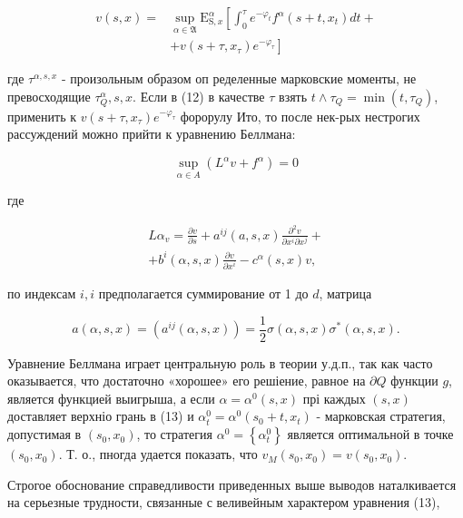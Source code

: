 \documentclass[10pt]{article}
\begin{document}
\[

\begin{aligned}

v(s, x)= & \sup _{\alpha \in \mathfrak{A}} \mathrm{E}_{\mathrm{S}, x}^{\alpha}\left[\int_{0}^{\tau} e^{-\varphi_{t}} f^{\alpha}\left(s+t, x_{t}\right) d t+\right. \\

& \left.+v\left(s+\tau, x_{\tau}\right) e^{-\varphi_{\tau}}\right]

\end{aligned}

\]



где $\tau^{\alpha, s, x}$ - произольным образом оп ределенные марковские моменты, не превосходящие $\tau_{Q}^{\alpha}, s, x$. Если в (12) в качестве $\tau$ взять $t \wedge \tau_{Q}=\min \left(t, \tau_{Q}\right)$, применить к $v\left(s+\tau, x_{\tau}\right) e^{-\varphi_{\tau}}$ форорулу Ито, то после нек-рых нестрогих рассуждений можно прийти к уравнению Беллмана:



\[

\sup _{\alpha \in A}\left(L^{\alpha} v+f^{\alpha}\right)=0

\]



где



\[

\begin{gathered}

L \alpha_{v}=\frac{\partial v}{\partial s}+a^{i j}(a, s, x) \frac{\partial^{2} v}{\partial x^{i} \partial x^{j}}+ \\

+b^{i}(\alpha, s, x) \frac{\partial v}{\partial x^{i}}-c^{\alpha}(s, x) v,

\end{gathered}

\]



по индексам $i, i$ предполагается суммирование от 1 до $d$, матрица



\[

a(\alpha, s, x)=\left(a^{i j}(\alpha, s, x)\right)=\frac{1}{2} \sigma(\alpha, s, x) \sigma^{*}(\alpha, s, x) .

\]



Уравнение Беллмана играет центральную роль в теории у.д.п., так как часто оказывается, что достаточно «хорошее» его решіение, равное на $\partial Q$ функции $g$, является функцией выигрыша, а если $\alpha=\alpha^{0}(s, x)$ прі каждых $(s, x)$ доставляет верхніо грань в (13) и $\alpha_{t}^{0}=\alpha^{0}\left(s_{0}+t, x_{t}\right)$ - марковская стратегия, допустимая в $\left(s_{0}, x_{0}\right)$, то стратегия $\alpha^{0}=\left\{\alpha_{t}^{0}\right\}$ является оптимальной в точке $\left(s_{0}, x_{0}\right)$. Т. о., пногда удается показать, что $v_{M}\left(s_{0}, x_{0}\right)=v\left(s_{0}, x_{0}\right)$.



Строгое обоснование справедливости приведенных выше выводов наталкивается на серьезные трудности, связанные с веливейным характером уравнения (13),
\end{document}
